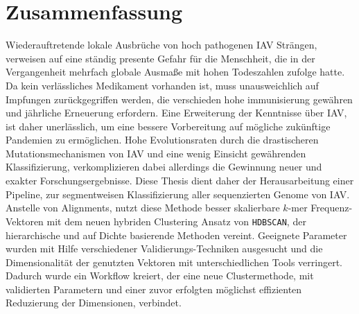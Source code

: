 \chapter*{Zusammenfassung}

Wiederauftretende lokale Ausbrüche von hoch pathogenen \gls{IAV} Strängen, verweisen auf eine ständig presente Gefahr für die Menschheit, die in der Vergangenheit mehrfach globale Ausmaße mit hohen Todeszahlen zufolge hatte. Da kein verlässliches Medikament vorhanden ist, muss unausweichlich auf Impfungen zurückgegriffen werden, die verschieden hohe immunisierung gewähren und jährliche Erneuerung erfordern. Eine Erweiterung der Kenntnisse über \gls{IAV}, ist daher unerlässlich, um eine bessere Vorbereitung auf mögliche zukünftige Pandemien zu ermöglichen. Hohe Evolutionsraten durch die drastischeren Mutationsmechanismen von \gls{IAV} und eine wenig Einsicht gewährenden Klassifizierung, verkomplizieren dabei allerdings die Gewinnung neuer und exakter Forschungsergebnisse. Diese Thesis dient daher der Herausarbeitung einer Pipeline, zur segmentweisen Klassifizierung aller sequenzierten Genome von \gls{IAV}. Anstelle von Alignments, nutzt diese Methode besser skalierbare $k$-mer Frequenz-Vektoren mit dem neuen hybriden Clustering Ansatz von \texttt{HDBSCAN}, der hierarchische und auf Dichte basierende Methoden vereint. Geeignete Parameter wurden mit Hilfe verschiedener Validierungs-Techniken ausgesucht und die Dimensionalität der genutzten Vektoren mit unterschiedlichen Tools verringert. Dadurch wurde ein Workflow kreiert, der eine neue Clustermethode, mit validierten Parametern und einer zuvor erfolgten möglichst effizienten Reduzierung der Dimensionen, verbindet.